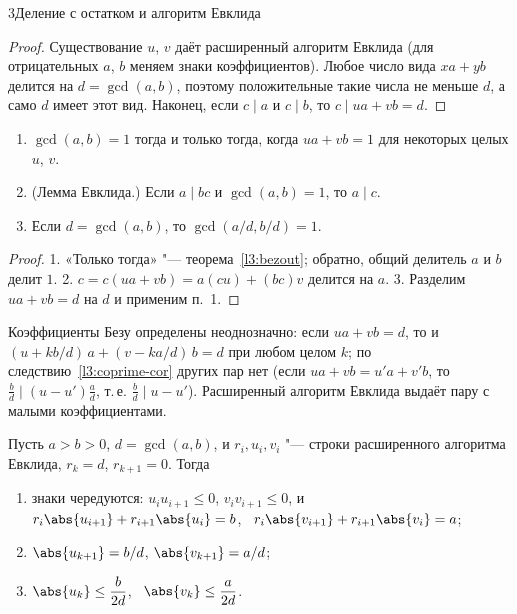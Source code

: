 \begin{lecture}{3}{Деление с остатком и алгоритм Евклида}
\begin{proof}
Существование $u$, $v$ даёт расширенный алгоритм Евклида (для отрицательных $a$, $b$ меняем
знаки коэффициентов). Любое число вида $xa + yb$ делится на $d = \gcd(a, b)$, поэтому положительные
такие числа не меньше $d$, а само $d$ имеет этот вид. Наконец, если $c \mid a$ и $c \mid b$, то
$c \mid ua + vb = d$.
\end{proof}

\begin{corollary}\label{l3:coprime-cor}
\begin{enumerate}
  \item $\gcd(a, b) = 1$ тогда и только тогда, когда $ua + vb = 1$ для некоторых целых $u$, $v$.
  \item (Лемма Евклида.) Если $a \mid bc$ и $\gcd(a, b) = 1$, то $a \mid c$.
  \item Если $d = \gcd(a, b)$, то $\gcd(a/d, b/d) = 1$.
\end{enumerate}
\end{corollary}

\begin{proof}
1. «Только тогда» "--- теорема~\ref{l3:bezout}; обратно, общий делитель $a$ и $b$ делит $1$.
2. $c = c(ua + vb) = a(cu) + (bc)v$ делится на $a$.
3. Разделим $ua + vb = d$ на $d$ и применим п.~1.
\end{proof}

Коэффициенты Безу определены неоднозначно: если $ua + vb = d$, то и
$(u + kb/d)\,a + (v - ka/d)\,b = d$ при любом целом $k$; по следствию~\ref{l3:coprime-cor} других
пар нет (если $ua + vb = u'a + v'b$, то $\frac{b}{d} \mid (u - u')\frac{a}{d}$, т.\,е.
$\frac{b}{d} \mid u - u'$). Расширенный алгоритм Евклида выдаёт пару с малыми коэффициентами.

\begin{theorem}\label{l3:xgcd-bounds}
Пусть $a > b > 0$, $d = \gcd(a, b)$, и $r_i, u_i, v_i$ "--- строки расширенного алгоритма Евклида,
$r_k = d$, $r_{k+1} = 0$. Тогда
\begin{enumerate}
  \item знаки чередуются: $u_i u_{i+1} \le 0$, $v_i v_{i+1} \le 0$, и
    $r_i \abs{u_{i+1}} + r_{i+1} \abs{u_i} = b$, \ $r_i \abs{v_{i+1}} + r_{i+1} \abs{v_i} = a$;
  \item $\abs{u_{k+1}} = b/d$, $\abs{v_{k+1}} = a/d$;
  \item $\abs{u_k} \le \dfrac{b}{2d}$, \ $\abs{v_k} \le \dfrac{a}{2d}$.
\end{enumerate}
\end{theorem}


\end{lecture}
